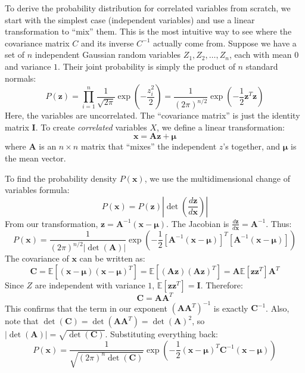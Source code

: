 \documentclass[12pt]{article}
\begin{document}
\begin{singlespace}
To derive the probability distribution for correlated variables from scratch, we start with the simplest case (independent variables) and use a linear transformation to ``mix'' them. This is the most intuitive way to see where the covariance matrix $C$ and its inverse $C^{-1}$ actually come from.
Suppose we have a set of $n$ independent Gaussian random variables $Z_1, Z_2, \dots, Z_n$, each with mean $0$ and variance $1$. Their joint probability is simply the product of $n$ standard normals:
\begin{equation}
P(\mathbf{z}) = \prod_{i=1}^n \frac{1}{\sqrt{2\pi}} \exp\left( -\frac{z_i^2}{2} \right) = \frac{1}{(2\pi)^{n/2}} \exp\left( -\frac{1}{2} \mathbf{z}^T \mathbf{z} \right)
\end{equation}
Here, the variables are uncorrelated. The ``covariance matrix'' is just the identity matrix $\mathbf{I}$. To create \textit{correlated} variables $X$, we define a linear transformation:
\begin{equation}
\mathbf{x} = \mathbf{A}\mathbf{z} + \boldsymbol{\mu}
\end{equation}
where $\mathbf{A}$ is an $n \times n$ matrix that ``mixes'' the independent $z$'s together, and $\boldsymbol{\mu}$ is the mean vector.

To find the probability density $P(\mathbf{x})$, we use the multidimensional change of variables formula:
\begin{equation}
P(\mathbf{x}) = P(\mathbf{z}) \left| \det\left( \frac{d\mathbf{z}}{d\mathbf{x}} \right) \right|
\end{equation}
From our transformation, $\mathbf{z} = \mathbf{A}^{-1}(\mathbf{x} - \boldsymbol{\mu})$. The Jacobian is $\frac{d\mathbf{z}}{d\mathbf{x}} = \mathbf{A}^{-1}$. Thus:
\begin{equation}
P(\mathbf{x}) = \frac{1}{(2\pi)^{n/2} |\det(\mathbf{A})|} \exp\left( -\frac{1}{2} \left[ \mathbf{A}^{-1}(\mathbf{x} - \boldsymbol{\mu}) \right]^T \left[ \mathbf{A}^{-1}(\mathbf{x} - \boldsymbol{\mu}) \right] \right)
\end{equation}
The covariance of $\mathbf{x}$ can be written as:
\begin{equation}
\mathbf{C} = \mathbb{E}[(\mathbf{x}-\boldsymbol{\mu})(\mathbf{x}-\boldsymbol{\mu})^T] = \mathbb{E}[(\mathbf{A}\mathbf{z})(\mathbf{A}\mathbf{z})^T] = \mathbf{A} \mathbb{E}[\mathbf{z}\mathbf{z}^T] \mathbf{A}^T
\end{equation}
Since $Z$ are independent with variance $1$, $\mathbb{E}[\mathbf{z}\mathbf{z}^T] = \mathbf{I}$. Therefore:
\begin{equation}
\mathbf{C} = \mathbf{A}\mathbf{A}^T
\end{equation}
This confirms that the term in our exponent $(\mathbf{A}\mathbf{A}^T)^{-1}$ is exactly $\mathbf{C}^{-1}$. Also, note that $\det(\mathbf{C}) = \det(\mathbf{A}\mathbf{A}^T) = \det(\mathbf{A})^2$, so $|\det(\mathbf{A})| = \sqrt{\det(\mathbf{C})}$. Substituting everything back:
\begin{equation}
P(\mathbf{x}) = \frac{1}{\sqrt{(2\pi)^n \det(\mathbf{C})}} \exp\left( -\frac{1}{2} (\mathbf{x} - \boldsymbol{\mu})^T \mathbf{C}^{-1} (\mathbf{x} - \boldsymbol{\mu}) \right)
\end{equation}


\end{singlespace}
\end{document}
